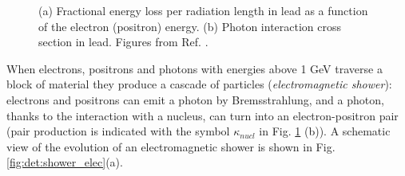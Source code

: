 \begin{figure}[ht]
\centering
{}
\caption{(a) Fractional energy loss per radiation length in lead as a function of the electron (positron) energy. (b) Photon interaction cross section in lead. Figures from Ref. \cite{Patrignani:2016xqp}. }
\label{fig:det:xsec_elec}
\end{figure}


When electrons, positrons and photons with energies above 1 GeV traverse a block of material they produce a cascade of particles (\textit{electromagnetic shower}): electrons and positrons can emit a photon by Bremsstrahlung, and a photon, thanks to the interaction with a nucleus, can turn into an electron-positron pair (pair production is indicated with the symbol $\kappa_{nucl}$ in Fig. \ref{fig:det:xsec_elec} (b)). A schematic view of the evolution of an electromagnetic shower is shown  in Fig. \ref{fig:det:shower_elec}(a). 

